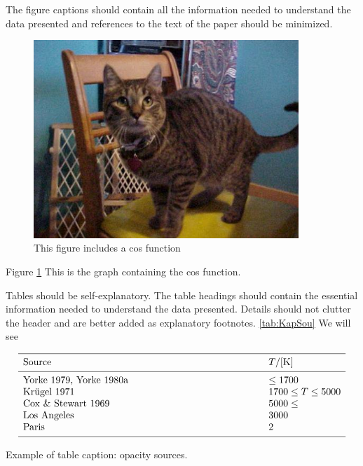 \documentclass[a4paper,10pt]{article}
\begin{document}
The figure captions should contain all the information needed to 
understand the data presented and references to the text of the paper 
should be minimized.


\begin{figure}[htb]
  \centering
  \includegraphics[width=10cm]{../animals_cleaned/cats/cats_00001.jpg}
     \caption{This figure includes a cos function}
         \label{Fig:Fig1}
\end{figure}

Figure \ref {Fig:Fig1} This is the graph containing the cos function.

Tables should be self-explanatory. The table headings should contain 
the essential information needed to understand the data presented. 
Details should not clutter the header and are better added as explanatory 
footnotes. \ref{tab:KapSou} We will see

\begin{table}[htb]
      
     $$ 
         \begin{array}{p{0.7\linewidth}l}
            \hline
            \noalign{\smallskip}
            Source      &  T / {[\mathrm{K}]} \\
            \noalign{\smallskip}
            \hline
            \noalign{\smallskip}
            Yorke 1979, Yorke 1980a & \leq 1700           \\
            Kr\"ugel 1971           & 1700 \leq T \leq 5000 \\
            Cox \& Stewart 1969     & 5000 \leq             \\
            Los Angeles & 3000\\
            Paris & 2\\
            \noalign{\smallskip}
            \hline
         \end{array}
     $$ 
     \caption[]{Example of table caption: opacity sources.}
         \label{tab:KapSou}
\end{table}
\end{document}

